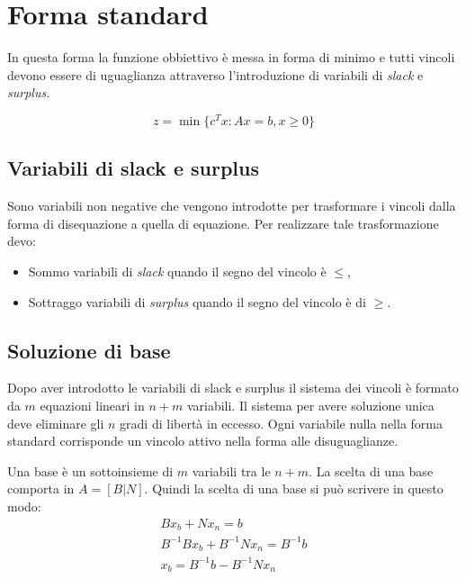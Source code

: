\section{Forma standard}
In questa forma la funzione obbiettivo è messa in forma di minimo e tutti vincoli devono essere di uguaglianza attraverso l'introduzione di variabili di \textit{slack} e \textit{surplus}.

\begin{equation} \label{formaStandard}
	z=\min \{c^Tx:Ax=b, x\geq0\}
\end{equation}

\subsection{Variabili di slack e surplus}
Sono variabili non negative che vengono introdotte per trasformare i vincoli dalla forma di disequazione a quella di equazione.
Per realizzare tale trasformazione devo:

\begin{itemize}
    \item Sommo variabili di \textit{slack} quando il segno del vincolo è $\leq$,
    \item Sottraggo variabili di \textit{surplus} quando il segno del vincolo è di $\geq$.
\end{itemize}

\subsection{Soluzione di base}

Dopo aver introdotto le variabili di slack e surplus il sistema dei vincoli è formato da $m$ equazioni lineari in $n+m$ variabili. 
Il sistema per avere soluzione unica deve eliminare gli $n$ gradi di libertà in eccesso. Ogni variabile nulla nella forma standard corrisponde un vincolo attivo nella forma alle disuguaglianze.

Una base è un sottoinsieme di $m$ variabili tra le $n+m$. La scelta di una base comporta in $A=[B|N]$. Quindi la scelta di una base si può scrivere in questo modo:
\begin{equation}\label{sceltaBase}
    \begin{array}{c}
    Bx_b+Nx_n=b \\
    B^{-1}Bx_b+B^{-1}Nx_n=B^{-1}b \\
    x_b=B^{-1}b-B^{-1}Nx_n
    \end{array}
\end{equation}

